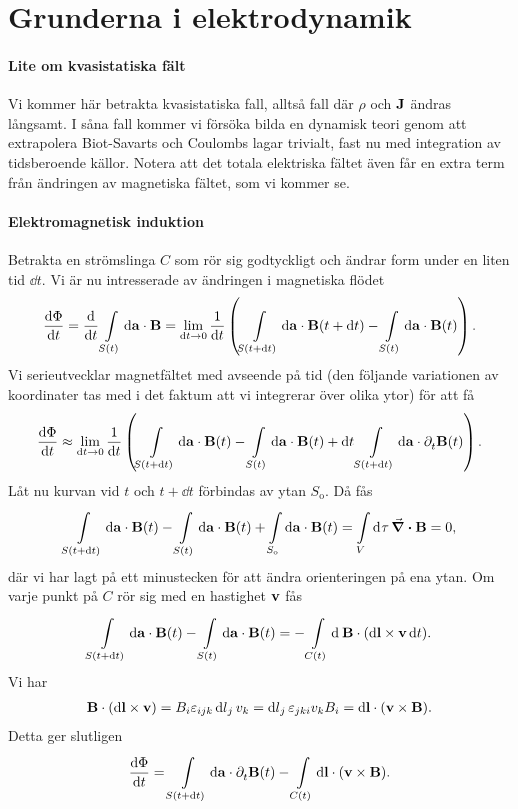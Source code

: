 \section{Grunderna i elektrodynamik}

\paragraph{Lite om kvasistatiska fält}
Vi kommer här betrakta kvasistatiska fall, alltså fall där $\rho$ och $\vb{J}$ ändras långsamt. I såna fall kommer vi försöka bilda en dynamisk teori genom att extrapolera Biot-Savarts och Coulombs lagar trivialt, fast nu med integration av tidsberoende källor. Notera att det totala elektriska fältet även får en extra term från ändringen av magnetiska fältet, som vi kommer se.

\paragraph{Elektromagnetisk induktion}
Betrakta en strömslinga $C$ som rör sig godtyckligt och ändrar form under en liten tid $\dd{t}$. Vi är nu intresserade av ändringen i magnetiska flödet
\begin{align*}
	\dv{\Phi}{t} = \dv{t}\int\limits_{S(t)}^{}\dd{\vb{a}}\cdot \vb{B} = \lim\limits_{\dd{t}\to 0}\frac{1}{\dd{t}}\left(\int\limits_{S(t + \dd{t})}^{}\dd{\vb{a}}\cdot \vb{B}(t + \dd{t}) - \int\limits_{S(t)}^{}\dd{\vb{a}}\cdot \vb{B}(t)\right).
\end{align*}
Vi serieutvecklar magnetfältet med avseende på tid (den följande variationen av koordinater tas med i det faktum att vi integrerar över olika ytor) för att få
\begin{align*}
	\dv{\Phi}{t} \approx \lim\limits_{\dd{t}\to 0}\frac{1}{\dd{t}}\left(\int\limits_{S(t + \dd{t})}^{}\dd{\vb{a}}\cdot \vb{B}(t) - \int\limits_{S(t)}^{}\dd{\vb{a}}\cdot \vb{B}(t) + \dd{t}\int\limits_{S(t + \dd{t})}^{}\dd{\vb{a}}\cdot \partial_{t}^{}\vb{B}(t)\right).
\end{align*}
Låt nu kurvan vid $t$ och $t + \dd{t}$ förbindas av ytan $S_{\text{o}}$. Då fås
\begin{align*}
	\int\limits_{S(t + \dd{t})}^{}\dd{\vb{a}}\cdot \vb{B}(t) - \int\limits_{S(t)}^{}\dd{\vb{a}}\cdot \vb{B}(t) + \int\limits_{S_{\text{o}}}^{}\dd{\vb{a}}\cdot \vb{B}(t) = \int\limits_{V}^{}\dd[]{\tau}\div{\vb{B}} = 0,
\end{align*}
där vi har lagt på ett minustecken för att ändra orienteringen på ena ytan. Om varje punkt på $C$ rör sig med en hastighet $\vb{v}$ fås
\begin{align*}
	\int\limits_{S(t + \dd{t})}^{}\dd{\vb{a}}\cdot \vb{B}(t) - \int\limits_{S(t)}^{}\dd{\vb{a}}\cdot \vb{B}(t) = -\int\limits_{C(t)}^{}\dd[]{}\vb{B}\cdot(\dd{\vb{l}}\times\vb{v}\dd{t}).
\end{align*}
Vi har
\begin{align*}
	\vb{B}\cdot(\dd{\vb{l}}\times\vb{v}) = B_{i}\varepsilon_{ijk}\dd{l}_{j}v_{k} = \dd{l}_{j}\varepsilon_{jki}v_{k}B_{i} = \dd{\vb{l}}\cdot(\vb{v}\times\vb{B}).
\end{align*}
Detta ger slutligen
\begin{align*}
	\dv{\Phi}{t} = \int\limits_{S(t + \dd{t})}^{}\dd{\vb{a}}\cdot \partial_{t}^{}\vb{B}(t) - \int\limits_{C(t)}{\dd{\vb{l}}\cdot(\vb{v}\times\vb{B})}.
\end{align*}

